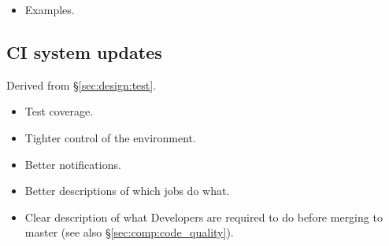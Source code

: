 
\begin{itemize}

  \item{Examples.}

\end{itemize}

\subsection{CI system updates}
\label{sec:comp:ci}

Derived from \S\ref{sec:design:test}.


\begin{itemize}

  \item{Test coverage.}
  \item{Tighter control of the environment.}
  \item{Better notifications.}
  \item{Better descriptions of which jobs do what.}
  \item{Clear description of what Developers are required to do before merging
  to master (see also \S\ref{sec:comp:code_quality}).}

\end{itemize}







